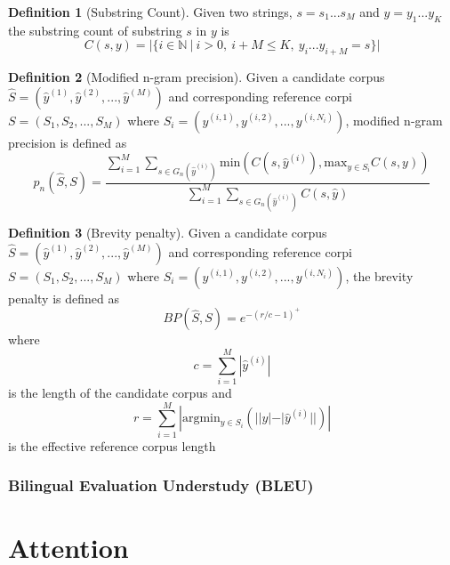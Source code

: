\documentclass[11pt]{article}
\theoremstyle{definition}
\newtheorem{definition}{Definition}[section]
\begin{document}
\begin{definition}[Substring Count] Given two strings, $s = s_1...s_M$ and $y = y_1...y_K$ the substring count of substring $s$ in $y$ is
\begin{equation}
C(s,y) = | \{i \in \mathbb{N} \ | \ i > 0, \ i+M \leq K, \ y_i...y_{i+M} = s \} |
\end{equation}  
\end{definition}

\begin{definition}[Modified n-gram precision] Given a candidate corpus $\hat{S} = (\hat{y}^{(1)}, \hat{y}^{(2)}, ..., \hat{y}^{(M)})$ and corresponding reference corpi $S = (S_1, S_2, ..., S_M)$ where $S_i = (y^{(i,1)}, y^{(i,2)}, ..., y^{(i,N_i)})$, modified n-gram precision is defined as
\begin{equation}
p_n(\hat{S} , S) = \frac{\sum_{i=1}^M \sum_{s \in G_n(\hat{y}^{(i)})} \mathrm{min} (C(s, \hat{y}^{(i)}), \mathrm{max}_{y \in S_i} C(s,y))}{\sum_{i=1}^M \sum_{s \in G_n(\hat{y}^{(i)})} C(s, \hat{y})}
\end{equation}
\end{definition}

\begin{definition}[Brevity penalty] Given a candidate corpus $\hat{S} = (\hat{y}^{(1)}, \hat{y}^{(2)}, ..., \hat{y}^{(M)})$ and corresponding reference corpi $S = (S_1, S_2, ..., S_M)$ where $S_i = (y^{(i,1)}, y^{(i,2)}, ..., y^{(i,N_i)})$, the brevity penalty is defined as
\begin{equation}
BP(\hat{S}, S) = e^{-(r/c-1)^+}
\end{equation}
where
\begin{equation}
c = \sum_{i=1}^M | \hat{y}^{(i)} |
\end{equation}
is the length of the candidate corpus and
\begin{equation}
r = \sum_{i=1}^M | \mathrm{arg} \mathrm{min}_{y \in S_i} \left( | |y| - |\hat{y}^{(i)}| | \right) |
\end{equation}
is the effective reference corpus length
\end{definition}

\subsubsection{Bilingual Evaluation Understudy (BLEU)}

\section{Attention}
\end{document}
